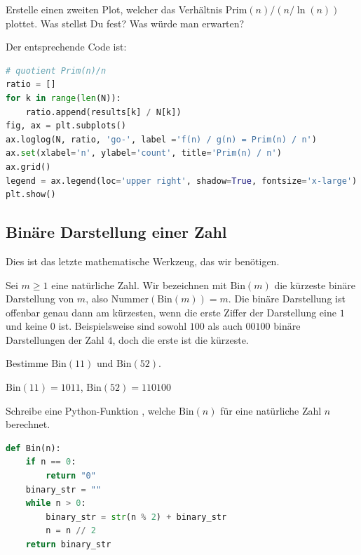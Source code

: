	\begin{myexercise}
		Erstelle einen zweiten Plot, welcher das Verhältnis $\text{Prim}(n) / (n / \ln{(n)})$ plottet. Was stellst Du fest? Was würde man erwarten?
		\begin{myanswer}
			Der entsprechende Code ist:
			\begin{lstlisting}[language=Python,numbers=none]
# quotient Prim(n)/n
ratio = []
for k in range(len(N)):
    ratio.append(results[k] / N[k])
fig, ax = plt.subplots()
ax.loglog(N, ratio, 'go-', label ='f(n) / g(n) = Prim(n) / n')
ax.set(xlabel='n', ylabel='count', title='Prim(n) / n')
ax.grid()
legend = ax.legend(loc='upper right', shadow=True, fontsize='x-large')
plt.show()
\end{lstlisting}
		\end{myanswer}
	\end{myexercise}

	\clearpage

	\subsection{Binäre Darstellung einer Zahl}
	Dies ist das letzte mathematische Werkzeug, das wir benötigen.

	Sei $m\geq 1$ eine natürliche Zahl. Wir bezeichnen mit $\text{Bin}(m)$ die kürzeste binäre Darstellung von $m$, also $\text{Nummer}(\text{Bin}(m)) = m$.
	Die binäre Darstellung ist offenbar genau dann am kürzesten, wenn die erste Ziffer der Darstellung eine $1$ und keine $0$ ist.
	Beispielsweise sind sowohl $100$ als auch $00100$ binäre Darstellungen der Zahl $4$, doch die erste ist die kürzeste.

	\begin{myexercise}
		Bestimme $\text{Bin}(11)$ und $\text{Bin}(52)$.
		\begin{myanswer}
			$\text{Bin}(11) = 1011$, $\text{Bin}(52) = 110100$
		\end{myanswer}
	\end{myexercise}

	\begin{mychallenge}
		Schreibe eine Python-Funktion , welche $\text{Bin}(n)$ für eine natürliche Zahl $n$ berechnet.
		\begin{myanswer}
			\begin{lstlisting}[language=Python,numbers=none]
def Bin(n):
    if n == 0:
        return "0"
    binary_str = ""
    while n > 0:
        binary_str = str(n % 2) + binary_str
        n = n // 2
    return binary_str
\end{lstlisting}
		\end{myanswer}
	\end{mychallenge}


